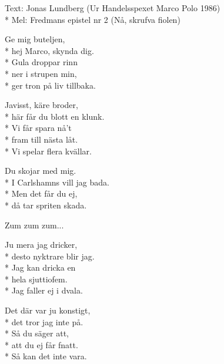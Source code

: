 \begin{SongText}
    \begin{SongInfo}
        Text: Jonas Lundberg (Ur Handelsspexet Marco Polo 1986)\\*%
        Mel: Fredmans epistel nr 2 (Nå, skrufva fiolen)
    \end{SongInfo}
    \begin{SongVerse}
        Ge mig buteljen,\\*%
        hej Marco, skynda dig.\\*%
        Gula droppar rinn\\*%
        ner i strupen min,\\*%
        ger tron på liv tillbaka.
    \end{SongVerse}
    \begin{SongVerse}
        Javisst, käre broder,\\*%
        här får du blott en klunk.\\*%
        Vi får spara nå’t\\*%
        fram till nästa låt.\\*%
        Vi spelar flera kvällar.
    \end{SongVerse}
    \begin{SongVerse}
        Du skojar med mig.\\*%
        I Carlshamns vill jag bada.\\*%
        Men det får du ej,\\*%
        då tar spriten skada.
    \end{SongVerse}
    \begin{SongVerse}
        Zum zum zum...
    \end{SongVerse}
    \begin{SongVerse}
        Ju mera jag dricker,\\*%
        desto nyktrare blir jag.\\*%
        Jag kan dricka en\\*%
        hela sjuttiofem.\\*%
        Jag faller ej i dvala.
    \end{SongVerse}
    \begin{SongVerse}
        Det där var ju konstigt,\\*%
        det tror jag inte på.\\*%
        Så du säger att,\\*%
        att du ej får fnatt.\\*%
        Så kan det inte vara.

\end{SongVerse}
\end{SongText}
